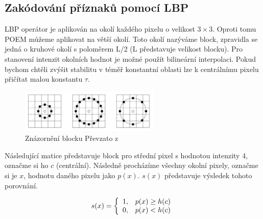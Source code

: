 \documentclass{report}
\begin{document}
\subsection{Zakódování příznaků pomocí LBP}
LBP operátor je aplikován na okolí každého pixelu o velikost $3 \times 3$. Oproti tomu POEM můžeme aplikovat na větší okolí. Toto okolí nazýváme block, zpravidla se jedná o kruhové okolí s poloměrem L/2 (L představuje velikost blocku). Pro stanovení intenzit okolních hodnot je možné použít bilineární interpolaci. Pokud bychom chtěli zvýšit stabilitu v téměř konstantní oblasti lze k centrálnímu pixelu přičítat malou konstantu $\tau$. 

\begin{figure}[H]
		\centering
		\includegraphics[width=253px]{./img/znazorneni_lbp.png}	
		\caption{Znázornění blocku Převzato z \cite{SrovnaniDeskriptoru}}
\end{figure}

Následující matice představuje block pro střední pixel s hodnotou intenzity 4, označme si ho $c$ (centrální). Následně procházíme všechny okolní pixely, označme si je $x$, hodnotu daného pixelu jako $p(x)$. $s(x)$ představuje výsledek tohoto porovnání.

\begin{displaymath} 
	\label{asd2} 
		    s(x) = \left\{ \begin{array}{r@{\quad}c}
    		1, & p(x) \geq h(c) \\
    		0, & p(x) < h(c) \\ \end{array} \right. 
\end{displaymath}
\end{document}
